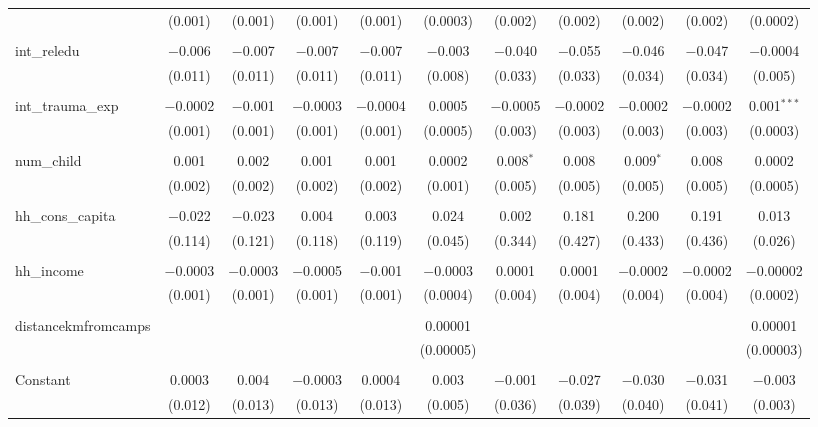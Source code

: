 \begin{table}[H]
\begin{tabular}{@{\extracolsep{4pt}}lcccccccccc}
  & (0.001) & (0.001) & (0.001) & (0.001) & (0.0003) & (0.002) & (0.002) & (0.002) & (0.002) & (0.0002) \\ 
  & & & & & & & & & & \\ 
 int\_reledu & $-$0.006 & $-$0.007 & $-$0.007 & $-$0.007 & $-$0.003 & $-$0.040 & $-$0.055 & $-$0.046 & $-$0.047 & $-$0.0004 \\ 
  & (0.011) & (0.011) & (0.011) & (0.011) & (0.008) & (0.033) & (0.033) & (0.034) & (0.034) & (0.005) \\ 
  & & & & & & & & & & \\ 
 int\_trauma\_exp & $-$0.0002 & $-$0.001 & $-$0.0003 & $-$0.0004 & 0.0005 & $-$0.0005 & $-$0.0002 & $-$0.0002 & $-$0.0002 & 0.001$^{***}$ \\ 
  & (0.001) & (0.001) & (0.001) & (0.001) & (0.0005) & (0.003) & (0.003) & (0.003) & (0.003) & (0.0003) \\ 
  & & & & & & & & & & \\ 
 num\_child & 0.001 & 0.002 & 0.001 & 0.001 & 0.0002 & 0.008$^{*}$ & 0.008 & 0.009$^{*}$ & 0.008 & 0.0002 \\ 
  & (0.002) & (0.002) & (0.002) & (0.002) & (0.001) & (0.005) & (0.005) & (0.005) & (0.005) & (0.0005) \\ 
  & & & & & & & & & & \\ 
 hh\_cons\_capita & $-$0.022 & $-$0.023 & 0.004 & 0.003 & 0.024 & 0.002 & 0.181 & 0.200 & 0.191 & 0.013 \\ 
  & (0.114) & (0.121) & (0.118) & (0.119) & (0.045) & (0.344) & (0.427) & (0.433) & (0.436) & (0.026) \\ 
  & & & & & & & & & & \\ 
 hh\_income & $-$0.0003 & $-$0.0003 & $-$0.0005 & $-$0.001 & $-$0.0003 & 0.0001 & 0.0001 & $-$0.0002 & $-$0.0002 & $-$0.00002 \\ 
  & (0.001) & (0.001) & (0.001) & (0.001) & (0.0004) & (0.004) & (0.004) & (0.004) & (0.004) & (0.0002) \\ 
  & & & & & & & & & & \\ 
 distancekmfromcamps &  &  &  &  & 0.00001 &  &  &  &  & 0.00001 \\ 
  &  &  &  &  & (0.00005) &  &  &  &  & (0.00003) \\ 
  & & & & & & & & & & \\ 
 Constant & 0.0003 & 0.004 & $-$0.0003 & 0.0004 & 0.003 & $-$0.001 & $-$0.027 & $-$0.030 & $-$0.031 & $-$0.003 \\ 
  & (0.012) & (0.013) & (0.013) & (0.013) & (0.005) & (0.036) & (0.039) & (0.040) & (0.041) & (0.003) \\ 

\end{tabular}
\end{table}
